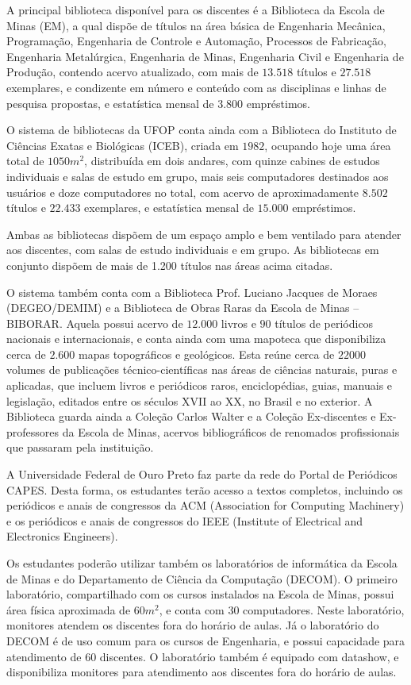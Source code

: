 \documentclass[
	12pt,				%
	openright,			%
	oneside,			%
	a4paper,			%
	english,			%
	brazil				%
	]{abntex2}
\begin{document}
A principal biblioteca disponível para os discentes é a Biblioteca da Escola de Minas (EM), a qual dispõe de títulos na área básica de Engenharia Mecânica, Programação, Engenharia de Controle e Automação, Processos de Fabricação, Engenharia Metalúrgica, Engenharia de Minas, Engenharia Civil e Engenharia de Produção, contendo acervo atualizado, com mais de $13.518$ títulos e $27.518$ exemplares, e condizente em número e conteúdo com as disciplinas e linhas de pesquisa propostas, e estatística mensal de $3.800$ empréstimos.

O sistema de bibliotecas da UFOP conta ainda com a Biblioteca do Instituto de Ciências Exatas e Biológicas (ICEB), criada em $1982$, ocupando hoje uma área total de $1050 m^{2}$, distribuída em dois andares, com quinze cabines de estudos individuais e salas de estudo em grupo, mais seis computadores destinados aos usuários e doze computadores no total, com acervo de aproximadamente $8.502$ títulos e $22.433$ exemplares, e estatística mensal de $15.000$ empréstimos.

Ambas as bibliotecas dispõem de um espaço amplo e bem ventilado para atender aos discentes, com salas de estudo individuais e em grupo. As bibliotecas em conjunto dispõem de mais de 1.200 títulos nas áreas acima citadas.

O sistema também conta com a Biblioteca Prof. Luciano Jacques de Moraes (DEGEO/DEMIM) e a Biblioteca de Obras Raras da Escola de Minas – BIBORAR. Aquela possui acervo de $12.000$ livros e $90$ títulos de periódicos nacionais e internacionais, e conta ainda com uma mapoteca que disponibiliza cerca de $2.600$ mapas topográficos e geológicos. Esta reúne cerca de $22000$ volumes de publicações técnico-científicas nas áreas de ciências naturais, puras e aplicadas, que incluem livros e periódicos raros, enciclopédias, guias, manuais e legislação, editados entre os séculos XVII ao XX, no Brasil e no exterior. A Biblioteca guarda ainda a Coleção Carlos Walter e a Coleção Ex-discentes e Ex-professores da Escola de Minas, acervos bibliográficos de renomados profissionais que passaram pela instituição.

A Universidade Federal de Ouro Preto faz parte da rede do Portal de Periódicos CAPES. Desta forma, os estudantes terão acesso a textos completos, incluindo os periódicos e anais de congressos da ACM (Association for Computing Machinery) e os periódicos e anais de congressos do IEEE (Institute of Electrical and Electronics Engineers).

Os estudantes poderão utilizar também os laboratórios de informática da Escola de Minas e do Departamento de Ciência da Computação (DECOM). O primeiro laboratório, compartilhado com os cursos instalados na Escola de Minas, possui área física aproximada de $60m^{2}$, e conta com $30$ computadores. Neste laboratório, monitores atendem os discentes fora do horário de aulas. Já o laboratório do DECOM é de uso comum para os cursos de Engenharia, e possui capacidade para atendimento de $60$ discentes. O laboratório também é equipado com datashow, e disponibiliza monitores para atendimento aos discentes fora do horário de aulas.
%
\end{document}
